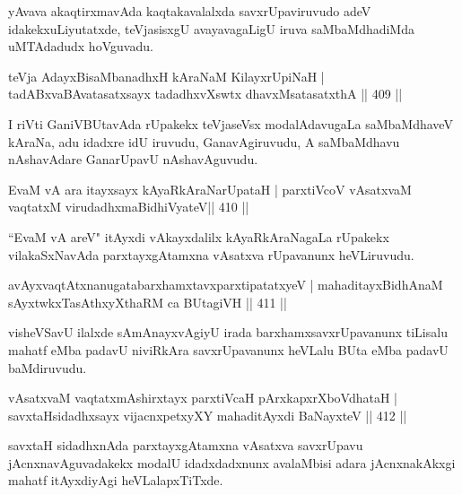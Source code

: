\begin{artha}
yAvava akaqtirxmavAda kaqtakavalalxda savxrUpaviruvudo adeV idakekx\break uLiyutatxde, teVjasisxgU avayavagaLigU iruva saMbaMdhadiMda uMTAdadudx hoVguvadu.
\end{artha}

\begin{shl}
teVja AdayxBisaMbanadhxH kAraNaM KilayxrUpiNaH |
tadABxvaBAvatasatxsayx tadadhxvXswtx dhavxMsatasatxthA \hfill || 409 ||
\end{shl}

\begin{artha}
I riVti GaniVBUtavAda rUpakekx teVjaseVsx modalAdavugaLa saMbaMdhaveV kAraNa, adu idadxre idU iruvudu, GanavAgiruvudu, A saMbaMdhavu nAshavAdare GanarUpavU nAshavAguvudu.
\end{artha}


\begin{shl}
EvaM vA ara itayxsayx kAyaRkAraNarUpataH |
parxtiVcoV vAsatxvaM vaqtatxM virudadhxmaBidhiVyateV\hfill || 410 ||
\end{shl}

\begin{artha}
``EvaM vA areV" itAyxdi vAkayxdalilx kAyaRkAraNagaLa rUpakekx vilakaSxNavAda parxtayxgAtamxna vAsatxva rUpavanunx heVLiruvudu.
\end{artha}


\begin{shl}
avAyxvaqtAtxnanugatabarxhamxtavxparxtipatatxyeV |
mahaditayxBidhAnaM sAyxtwkxTasAthxyXthaRM ca BUtagiVH \hfill || 411 ||
\end{shl}

\begin{artha}
visheVSavU ilalxde sAmAnayxvAgiyU irada barxhamxsavxrUpavanunx tiLisalu mahatf eMba padavU niviRkAra savxrUpavanunx heVLalu BUta eMba padavU baMdiruvudu.
\end{artha}


\begin{shl}
vAsatxvaM vaqtatxmAshirxtayx parxtiVcaH pArxkapxrXboVdhataH |
savxtaHsidadhxsayx vijacnxpetxyXY mahaditAyxdi BaNayxteV \hfill || 412 ||
\end{shl}

\begin{artha}
savxtaH sidadhxnAda parxtayxgAtamxna vAsatxva savxrUpavu jAcnxnavAguvadakekx modalU idadxdadxnunx avalaMbisi adara jAcnxnakAkxgi mahatf itAyxdiyAgi heVLalapxTiTxde. 
\end{artha}

